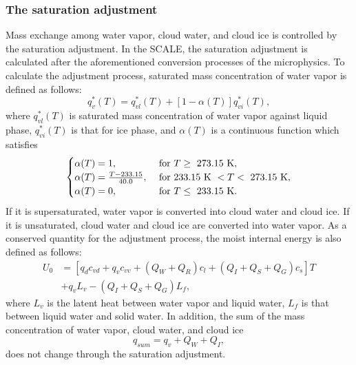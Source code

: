 \subsubsection{The saturation adjustment}
Mass exchange among water vapor, cloud water, and cloud ice is controlled by the saturation adjustment.
In the SCALE, the saturation adjustment is calculated after the aforementioned conversion processes of the microphysics.
To calculate the adjustment process, saturated mass concentration of water vapor is defined as follows:
\begin{equation}
  q^{*}_{v}(T) = q^{*}_{vl}(T)+[1-\alpha (T)]q^{*}_{vi}(T)\label{eq:satuqv},
\end{equation}
where $q^{*}_{vl}(T)$ is saturated mass concentration of water vapor against liquid phase, $q^{*}_{vi}(T)$ is that for ice phase, and $\alpha (T)$ is a continuous function which satisfies
\begin{align}
\begin{cases}
  \alpha (T) = 1, & {\rm \ for\ } T \geq {\rm \ 273.15 \ K} ,\\
  \alpha (T) = \frac{T-233.15}{40.0}, & {\rm \ for\ 233.15\ K \ } < T < {\rm \ 273.15 \ K},\\
  \alpha (T) = 0, & {\rm \ for\ } T \leq {\rm \ 233.15 \ K}.
\end{cases}
\end{align}
If it is supersaturated, water vapor is converted into cloud water and cloud ice.
If it is unsaturated, cloud water and cloud ice are converted into water vapor.
As a conserved quantity for the adjustment process, the moist internal energy is also defined as follows:
\begin{align}
  U_{0}&=[q_{d}c_{vd}+q_{v}c_{vv}+(Q_{W}+Q_{R})c_{l}+(Q_{I}+Q_{S}+Q_{G})c_{s}]T \nonumber \\ 
  &+q_{v}L_{v}-(Q_{I}+Q_{S}+Q_{G})L_{f},
\end{align}
where $L_{v}$ is the latent heat between water vapor and liquid water, $L_{f}$ is that between liquid water and solid water. In addition, the sum of the mass concentration of water vapor, cloud water, and cloud ice
\begin{equation}
  q_{sum}=q_{v}+Q_{W}+Q_{I},
\end{equation}
does not change through the saturation adjustment.

